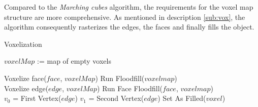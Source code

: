 Compared to the \emph{Marching cubes} algorithm, the requirements for the voxel map structure
are more comprehensive. As mentioned in description \ref{sub:vox}, the algorithm consequently rasterizes
the edges, the faces and finally fills the object.

\begin{algorithm}[H]
\caption{Voxelization}
\label{alg:vox}
\begin{algorithmic}[1]
			\State $voxelMap$ := map of empty voxels

			\State Voxelize face($face$, $voxelMap$)
		\EndFor
		\State Run Floodfill($voxel map$)
		\State {}
	\EndFunction
	\\
			\State Voxelize edge($edge$, $voxelMap$)
		\EndFor
		\State Run Face Floodfill($face$, $voxel map$)
	\EndFunction
	\\
		\State $v_{0}$ = First Vertex($edge$)
		\State $v_{1}$ = Second Vertex($edge$)
			\State Set As Filled($voxel$)
		\EndFor
	\EndFunction
\end{algorithmic}
\end{algorithm}